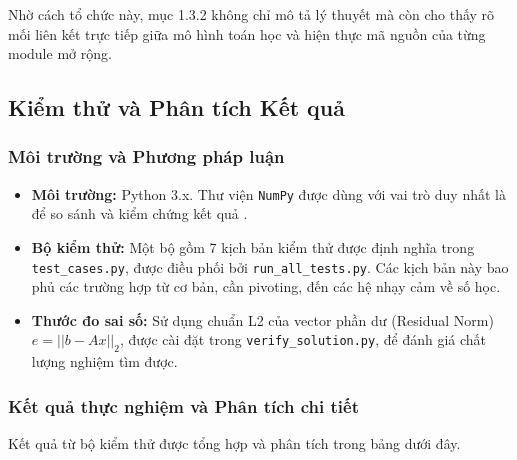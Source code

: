 Nhờ cách tổ chức này, mục 1.3.2 không chỉ mô tả lý thuyết mà còn cho thấy rõ mối liên kết trực tiếp giữa mô hình toán học và hiện thực mã nguồn của từng module mở rộng.

\subsection{Kiểm thử và Phân tích Kết quả}

\subsubsection{Môi trường và Phương pháp luận}
\begin{itemize}
    \item \textbf{Môi trường:} Python 3.x. Thư viện \texttt{NumPy} được dùng với vai trò duy nhất là để so sánh và kiểm chứng kết quả \cite{numpy_docs}.
    \item \textbf{Bộ kiểm thử:} Một bộ gồm 7 kịch bản kiểm thử được định nghĩa trong \texttt{test\_cases.py}, được điều phối bởi \texttt{run\_all\_tests.py}. Các kịch bản này bao phủ các trường hợp từ cơ bản, cần pivoting, đến các hệ nhạy cảm về số học.
    \item \textbf{Thước đo sai số:} Sử dụng chuẩn L2 của vector phần dư (Residual Norm) $e = ||b - Ax||_2$, được cài đặt trong \texttt{verify\_solution.py}, để đánh giá chất lượng nghiệm tìm được.
\end{itemize}

\subsubsection{Kết quả thực nghiệm và Phân tích chi tiết}
Kết quả từ bộ kiểm thử được tổng hợp và phân tích trong bảng dưới đây.

